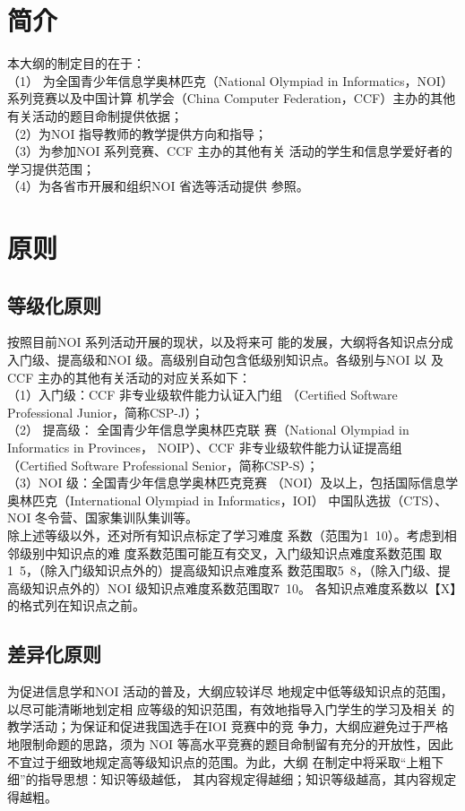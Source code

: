 \documentclass[12pt,twiside,a4paper]{ctexbook}
\numberwithin{chapter}{part}
\begin{document}
\section{简介}
本大纲的制定目的在于：\\
（1） 为全国青少年信息学奥林匹克（National
Olympiad in Informatics，NOI）系列竞赛以及中国计算
机学会（China Computer Federation，CCF）主办的其他
有关活动的题目命制提供依据；\\
（2）为NOI 指导教师的教学提供方向和指导；\\
（3）为参加NOI 系列竞赛、CCF 主办的其他有关
活动的学生和信息学爱好者的学习提供范围；\\
（4）为各省市开展和组织NOI 省选等活动提供
参照。
\section{原则}
\subsection{等级化原则}
按照目前NOI 系列活动开展的现状，以及将来可
能的发展，大纲将各知识点分成入门级、提高级和NOI
级。高级别自动包含低级别知识点。各级别与NOI 以
及CCF 主办的其他有关活动的对应关系如下：\\
（1）入门级：CCF 非专业级软件能力认证入门组
（Certified Software Professional Junior，简称CSP-J）；\\
（2） 提高级： 全国青少年信息学奥林匹克联
赛（National Olympiad in Informatics in Provinces，
NOIP）、CCF 非专业级软件能力认证提高组（Certified
Software Professional Senior，简称CSP-S）；\\
（3）NOI 级：全国青少年信息学奥林匹克竞赛
（NOI）及以上，包括国际信息学奥林匹克（International
Olympiad in Informatics，IOI） 中国队选拔（CTS）、
NOI 冬令营、国家集训队集训等。\\
除上述等级以外，还对所有知识点标定了学习难度
系数（范围为1~10）。考虑到相邻级别中知识点的难
度系数范围可能互有交叉，入门级知识点难度系数范围
取1~5，（除入门级知识点外的）提高级知识点难度系
数范围取5~8，（除入门级、提高级知识点外的）NOI
级知识点难度系数范围取7~10。
各知识点难度系数以【X】的格式列在知识点之前。
\subsection{差异化原则}
为促进信息学和NOI 活动的普及，大纲应较详尽
地规定中低等级知识点的范围，以尽可能清晰地划定相
应等级的知识范围，有效地指导入门学生的学习及相关
的教学活动；为保证和促进我国选手在IOI 竞赛中的竞
争力，大纲应避免过于严格地限制命题的思路，须为
NOI 等高水平竞赛的题目命制留有充分的开放性，因此
不宜过于细致地规定高等级知识点的范围。为此，大纲
在制定中将采取“上粗下细”的指导思想：知识等级越低，
其内容规定得越细；知识等级越高，其内容规定得越粗。
\end{document}

